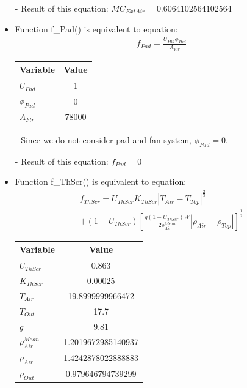 \documentclass[a4paper]{article}
\begin{document}
\begin{itemize}
  \item[-] Result of this equation: \(MC_{ExtAir} = 0.6064102564102564\)

  \item Function f\_Pad() is equivalent to equation:
        \begin{align*}
          f_{Pad} = \frac{U_{Pad} \phi_{Pad}}{A_{Flr}}
        \end{align*}

        \begin{table}[H]
          \centering
          \begin{tabular}{@{}lS@{}}
            \toprule
            \textbf{Variable} & \textbf{Value} \\
            \midrule
            \(U_{Pad}\)       & 1              \\
            \(\phi_{Pad}\)    & 0              \\
            \(A_{Flr}\)       & 78000          \\
            \bottomrule
          \end{tabular}
        \end{table}
  \item[-] Since we do not consider pad and  fan system, $\phi_{Pad} = 0$.
  \item[-] Result of this equation: \(f_{Pad} = 0\)

  \item Function f\_ThScr() is equivalent to equation:
        \begin{multline*}
          f_{ThScr} = U_{ThScr} K_{ThScr} |T_{Air} - T_{Top}|^{\frac{2}{3}} \\
          + (1 - U_{ThScr}) {\left[\frac{g(1 - U_{ThScr})W}{2\rho^{Mean}_{Air}} |\rho_{Air} - \rho_{Top}|\right]}^{\frac{1}{2}}
        \end{multline*}

        \begin{table}[H]
          \centering
          \begin{tabular}{@{}lS[table-format=2.16]@{}}
            \toprule
            \textbf{Variable}     & \textbf{Value}     \\
            \midrule
            \(U_{ThScr}\)         & 0.863              \\
            \(K_{ThScr}\)         & 0.00025            \\
            \(T_{Air}\)           & 19.8999999966472   \\
            \(T_{Out}\)           & 17.7               \\
            \(g\)                 & 9.81               \\
            \(\rho^{Mean}_{Air}\) & 1.2019672985140937 \\
            \(\rho_{Air}\)        & 1.4242878022888883 \\
            \(\rho_{Out}\)        & 0.979646794739299  \\
            \bottomrule
          \end{tabular}
        \end{table}


\end{itemize}
\end{document}
